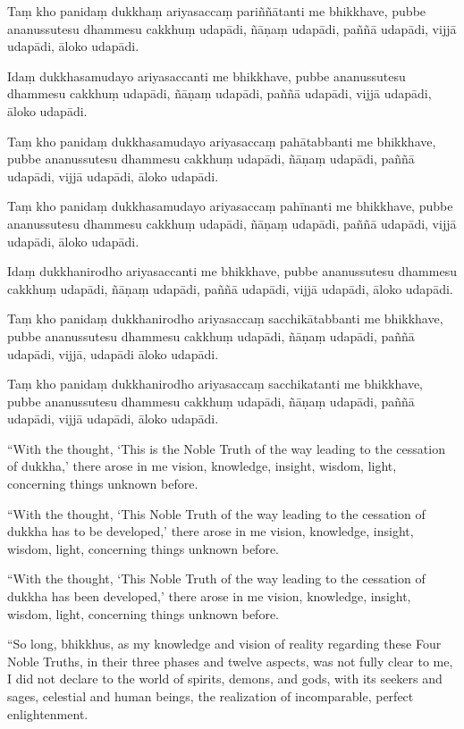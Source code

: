 Taṃ kho panidaṃ dukkhaṃ ariyasaccaṃ pariññātanti me bhikkhave, pubbe
ananussutesu dhammesu cakkhuṃ udapādi, ñāṇaṃ udapādi, paññā udapādi,
vijjā udapādi, āloko udapādi.

Idaṃ dukkhasamudayo ariyasaccanti me bhikkhave, pubbe ananussutesu
dhammesu cakkhuṃ udapādi, ñāṇaṃ udapādi, paññā udapādi, vijjā udapādi,
āloko udapādi.

Taṃ kho panidaṃ dukkhasamudayo ariyasaccaṃ pahātabbanti me bhikkhave,
pubbe ananussutesu dhammesu cakkhuṃ udapādi, ñāṇaṃ udapādi, paññā
udapādi, vijjā udapādi, āloko udapādi.

Taṃ kho panidaṃ dukkhasamudayo ariyasaccaṃ pahīnanti me bhikkhave, pubbe
ananussutesu dhammesu cakkhuṃ udapādi, ñāṇaṃ udapādi, paññā udapādi,
vijjā udapādi, āloko udapādi.

Idaṃ dukkhanirodho ariyasaccanti me bhikkhave, pubbe ananussutesu
dhammesu cakkhuṃ udapādi, ñāṇaṃ udapādi, paññā udapādi, vijjā udapādi,
āloko udapādi.

Taṃ kho panidaṃ dukkhanirodho ariyasaccaṃ sacchikātabbanti me bhikkhave,
pubbe ananussutesu dhammesu cakkhuṃ udapādi, ñāṇaṃ udapādi, paññā
udapādi, vijjā, udapādi āloko udapādi.

Taṃ kho panidaṃ dukkhanirodho ariyasaccaṃ sacchikatanti me bhikkhave,
pubbe ananussutesu dhammesu cakkhuṃ udapādi, ñāṇaṃ udapādi, paññā
udapādi, vijjā udapādi, āloko udapādi.

\clearpage

\englishText

``With the thought, `This is the Noble Truth of the way leading to the
cessation of dukkha,' there arose in me vision, knowledge, insight,
wisdom, light, concerning things unknown before.

``With the thought, `This Noble Truth of the way leading to the
cessation of dukkha has to be developed,' there arose in me vision,
knowledge, insight, wisdom, light, concerning things unknown before.

``With the thought, `This Noble Truth of the way leading to the
cessation of dukkha has been developed,' there arose in me vision,
knowledge, insight, wisdom, light, concerning things unknown before.

``So long, bhikkhus, as my knowledge and vision of reality regarding
these Four Noble Truths, in their three phases and twelve aspects, was
not fully clear to me, I did not declare to the world of spirits,
demons, and gods, with its seekers and sages, celestial and human
beings, the realization of incomparable, perfect enlightenment.

